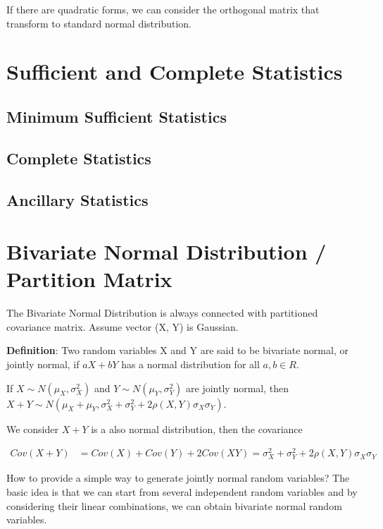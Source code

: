 If there are quadratic forms, we can consider the orthogonal matrix that transform to standard normal distribution.

\section{Sufficient and Complete Statistics}


\subsection{Minimum Sufficient Statistics}


\subsection{Complete Statistics}


\subsection{Ancillary Statistics}




\section{Bivariate Normal Distribution / Partition Matrix}
The Bivariate Normal Distribution is always connected with partitioned covariance matrix. Assume vector (X, Y) is Gaussian. 

\textbf{Definition}: Two random variables X and Y are said to be bivariate normal, or jointly normal, if $aX+bY$ has a normal distribution for all $a,b \in R$.

If $X \sim N( \mu_X, \sigma^2_X)$ and $Y \sim N( \mu_Y, \sigma^2_Y)$ are jointly normal, then $ X + Y  \sim N( \mu_X + \mu_Y, \sigma^2_X + \sigma^2_Y + 2 \rho(X,Y) \sigma_X \sigma_Y) $. 

We consider $X + Y$ is a also normal distribution, then the covariance 

\begin{align*}
	Cov(X+Y) &= Cov(X) + Cov(Y) + 2Cov(XY) = \sigma^2_X + \sigma^2_Y + 2 \rho(X,Y) \sigma_X \sigma_Y
\end{align*}

How to provide a simple way to generate jointly normal random variables? The basic idea is that we can start from several independent random variables and by considering their linear combinations, we can obtain bivariate normal random variables. 

